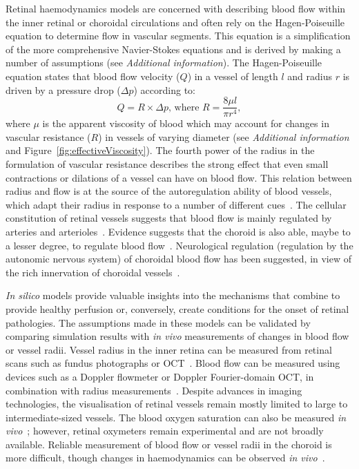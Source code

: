 \documentclass{article}
\begin{document}
Retinal haemodynamics models are concerned with describing blood flow within the inner retinal or choroidal circulations and often rely on the Hagen-Poiseuille equation to determine flow in vascular segments.
This equation is a simplification of the more comprehensive Navier-Stokes equations and is derived by making a number of assumptions (see \textit{Additional information}).
The Hagen-Poiseuille equation states that blood flow velocity ($Q$) in a vessel of length $l$ and radius $r$ is driven by a pressure drop ($\Delta p$) according to:
\begin{equation*}
  \label{eq:Hagen-Poiseuille}
  Q = \mathit R\times\Delta p \mbox{, where } \mathit{R} = \frac{8\mu l}{\pi r^4},
\end{equation*}
where $\mu$ is the apparent viscosity of blood which may account for changes in vascular resistance ($\mathit R$) in vessels of varying diameter (see \textit{Additional information} and Figure~\ref{fig:effectiveViscosity}).
The fourth power of the radius in the formulation of vascular resistance describes the strong effect that even small contractions or dilations of a vessel can have on blood flow.
This relation between radius and flow is at the source of the autoregulation ability of blood vessels, which adapt their radius in response to a number of different cues~\cite{Kur_2012}.
The cellular constitution of retinal vessels suggests that blood flow is mainly regulated by arteries and arterioles~\cite{An_2020,Kur_2012}.
Evidence suggests that the choroid is also able, maybe to a lesser degree, to regulate blood flow~\cite{Polska_2007,Riva_1997}.
Neurological regulation (regulation by the autonomic nervous system) of choroidal blood flow has been suggested, in view of the rich innervation of choroidal vessels~\cite{BeharCohen_2020,Polska_2007}.

\textit{In silico} models provide valuable insights into the mechanisms that combine to provide healthy perfusion or, conversely, create conditions for the onset of retinal pathologies.
The assumptions made in these models can be validated by comparing simulation results with \textit{in vivo} measurements of changes in blood flow or vessel radii.
Vessel radius in the inner retina can be measured from retinal scans such as fundus photographs or OCT~\cite{DoblhoffDier_2014}.
Blood flow can be measured using devices such as a Doppler flowmeter or Doppler Fourier-domain OCT, in combination with radius measurements~\cite{DoblhoffDier_2014,Wang_2009}.
Despite advances in imaging technologies, the visualisation of retinal vessels remain mostly limited to large to intermediate-sized vessels.
The blood oxygen saturation can also be measured \textit{in vivo}~\cite{Geirsdottir_2013}; however, retinal oxymeters remain experimental and are not broadly available.
Reliable measurement of blood flow or vessel radii in the choroid is more difficult, though changes in haemodynamics can be observed \textit{in vivo}~\cite{Riva_1997,Scherm_2019}.
\end{document}
